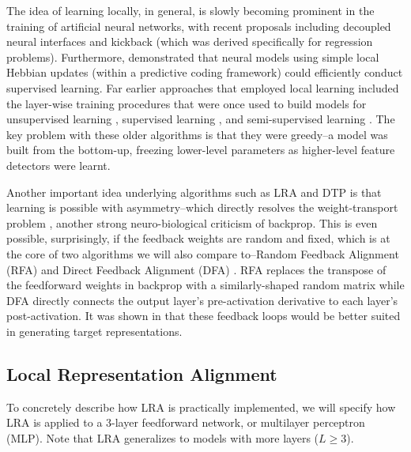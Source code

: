 \documentclass[letterpaper]{article} %
\begin{document}
The idea of learning locally, in general, is slowly becoming prominent in the training of artificial neural networks, with recent proposals including decoupled neural interfaces \cite{jaderberg2016decoupled} and kickback \cite{balduzzi2015kickback} (which was derived specifically for regression problems). Furthermore, \cite{whittington2017equivalence} demonstrated that neural models using simple local Hebbian updates (within a predictive coding framework) could efficiently conduct supervised learning. Far earlier approaches that employed local learning included the layer-wise training procedures that were once used to build models for unsupervised learning \cite{bengio_greedy_2007}, supervised learning \cite{lee_deeply-supervised_2014}, and semi-supervised learning \cite{ororbia_deep_hybrid_2015a,ororbia2015online}.  The key problem with these older algorithms is that they were greedy--a model was built from the bottom-up, freezing lower-level parameters as higher-level feature detectors were learnt. 



Another important idea underlying algorithms such as LRA and DTP is that learning is possible with asymmetry--which directly resolves the weight-transport problem \cite{grossberg_resonance_1987,liao2016important}, another strong neuro-biological criticism of backprop. This is even possible, surprisingly, if the feedback weights are random and fixed, which is at the core of two algorithms we will also compare to--Random Feedback Alignment (RFA) \cite{lillicrap2016random} and Direct Feedback Alignment (DFA) \cite{nokland2016direct}. RFA replaces the transpose of the feedforward weights in backprop with a similarly-shaped random matrix while DFA directly connects the output layer's pre-activation derivative to each layer's post-activation. It was shown in \cite{ororbia2017learning,ororbia2018conducting} that these feedback loops would be better suited in generating target representations.%

\subsection{Local Representation Alignment}
\label{lra}
To concretely describe how LRA is practically implemented, we will specify how LRA is applied to a 3-layer feedforward network, or multilayer perceptron (MLP). Note that LRA generalizes to models with more layers ($L \geq 3$). 
\end{document}
